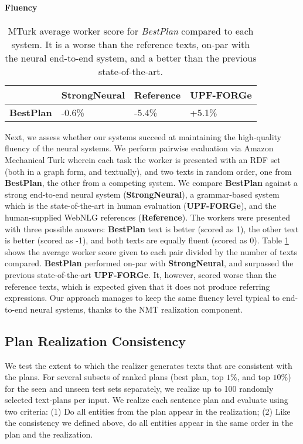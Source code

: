 \documentclass[11pt,a4paper]{article}
\newcommand\ourplans[0]{BestPlan}
\newcommand\ourbaseline[0]{StrongNeural}
\begin{document}
\paragraph{Fluency} 
\begin{table}[t]
\resizebox{\linewidth}{!}
{
\begin{tabular}{|l|l|l|l|}
\hline
            & \textbf{\ourbaseline} & \textbf{Reference} & \textbf{UPF-FORGe} \\ \hline
\textbf{\ourplans}   & -0.6\%      & -5.4\% &  +5.1\%   \\ \hline
\end{tabular}
}
\caption{MTurk average worker score for \emph{\ourplans} compared to each system. 
It is a worse than the reference texts, on-par with the neural end-to-end system, and a better than the previous state-of-the-art.}
\label{table:mturk}
\end{table} Next, we assess whether our systems succeed at maintaining the high-quality fluency of the neural systems.
We perform pairwise evaluation via Amazon Mechanical Turk wherein each task the worker is presented with an RDF set (both in a graph form, and textually), and two texts in random order, one from \textbf{\ourplans}, the other from a competing system. 
We compare \textbf{\ourplans} against a strong end-to-end neural system (\textbf{\ourbaseline}), a grammar-based system which is the state-of-the-art in human evaluation (\textbf{UPF-FORGe}), and the human-supplied WebNLG references (\textbf{Reference}).
The workers were presented with three possible answers: \textbf{\ourplans} text is better (scored as 1), the other text is better (scored as -1), and both texts are equally fluent (scored as 0).
Table \ref{table:mturk} shows the average worker score given to each pair divided by the number of texts compared. 
\textbf{\ourplans} performed on-par with \textbf{\ourbaseline}, and surpassed the previous state-of-the-art \textbf{UPF-FORGe}. It, however, scored worse than the reference texts, which is expected given that it does not produce referring expressions.
Our approach manages to keep the same fluency level typical to end-to-end neural systems, thanks to the NMT realization component.


\subsection{Plan Realization Consistency}
We test the extent to which the realizer generates texts that are consistent with the plans. For several subsets of ranked plans (best plan, top $1\%$, and top $10\%$) for the seen and unseen test sets separately, 
we realize up to 100 randomly selected text-plans per input.
We realize each sentence plan and evaluate using two criteria: (1) Do all entities from the plan appear in the realization; (2) Like the consistency we defined above, do all entities appear in the same order in the plan and the realization.
\end{document}

